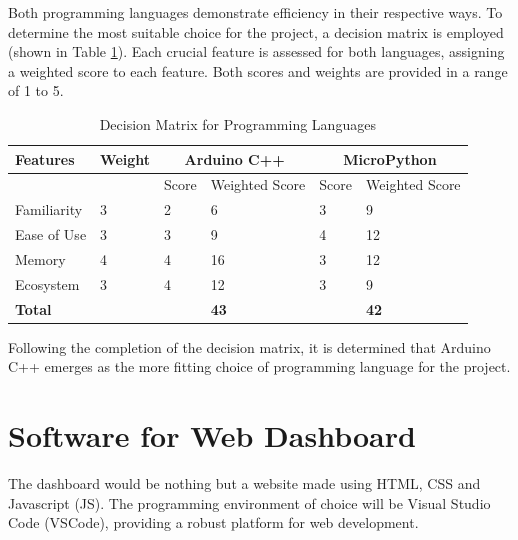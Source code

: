 \noindent Both programming languages demonstrate efficiency in their respective ways.  To determine the most suitable choice for the project, a decision matrix is employed (shown in Table \ref{fig:decision-matrix}). Each crucial feature is assessed for both languages, assigning a weighted score to each feature. Both scores and weights are provided in a range of 1 to 5.


\begin{table}[!h]
\centering
\begin{tabularx}{\textwidth}{|X|X|X|X|X|X|}
    \hline
    \textbf{Features} 
    & \textbf{Weight}
    & \multicolumn{2}{c|}{\textbf{Arduino C++}}
    &  \multicolumn{2}{c|}{\textbf{MicroPython}}  \\ \hline

    &
    & Score 
    & Weighted Score
    & Score 
    & Weighted Score \\ \hline

    Familiarity 
    & 3 
    & 2 
    & 6
    & 3
    & 9 \\ \hline
    
    Ease of Use
    & 3 
    & 3 
    & 9
    & 4 
    & 12 \\ \hline
    
    Memory 
    & 4 
    & 4 
    & 16
    & 3 
    & 12 \\ \hline
    
    Ecosystem 
    & 3 
    & 4 
    & 12
    & 3 
    & 9 \\ \hline
    
    \textbf{Total} 
    & 
    &
    & \textbf{43} 
    &  
    & \textbf{42}  \\ \hline
    
\end{tabularx}
\caption{Decision Matrix for Programming Languages}
\label{fig:decision-matrix}
\end{table}

\noindent Following the completion of the decision matrix, it is determined that Arduino C++ emerges as the more fitting choice of programming language for the project. \\


\section{Software for Web Dashboard}
The dashboard would be nothing but a website made using HTML, CSS and Javascript (JS). The programming environment of choice will be Visual Studio Code (VSCode), providing a robust platform for web development. \\

